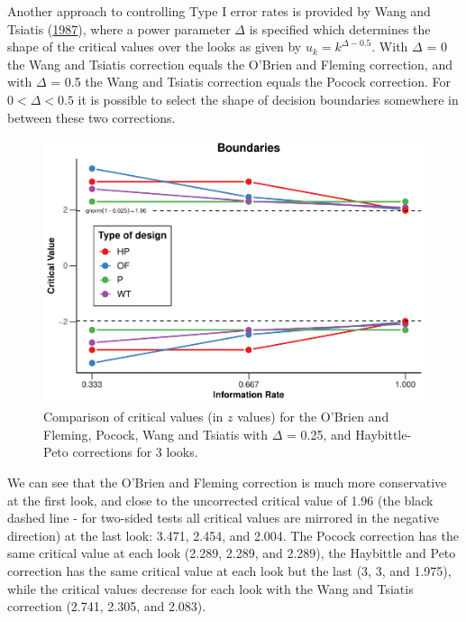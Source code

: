 \documentclass[
  english,
  ,man,floatsintext]{apa6}
\begin{document}
Another approach to controlling Type I error rates is provided by Wang and Tsiatis (\protect\hyperlink{ref-wang_approximately_1987}{1987}), where a power parameter \(\Delta\) is specified which determines the shape of the critical values over the looks as given by \(u_k = k^{\Delta - 0.5}\). With \(\Delta\) = 0 the Wang and Tsiatis correction equals the O'Brien and Fleming correction, and with \(\Delta\) = 0.5 the Wang and Tsiatis correction equals the Pocock correction. For \(0 < \Delta < 0.5\) it is possible to select the shape of decision boundaries somewhere in between these two corrections.

\begin{figure}
\centering
\includegraphics{sequential_tutorial_files/figure-latex/spending-comparison-1.pdf}
\caption{\label{fig:spending-comparison}Comparison of critical values (in \(z\) values) for the O'Brien and Fleming, Pocock, Wang and Tsiatis with \(\Delta\) = 0.25, and Haybittle-Peto corrections for 3 looks.}
\end{figure}

We can see that the O'Brien and Fleming correction is much more conservative at the first look, and close to the uncorrected critical value of 1.96 (the black dashed line - for two-sided tests all critical values are mirrored in the negative direction) at the last look: 3.471, 2.454, and 2.004. The Pocock correction has the same critical value at each look (2.289, 2.289, and 2.289), the Haybittle and Peto correction has the same critical value at each look but the last (3, 3, and 1.975), while the critical values decrease for each look with the Wang and Tsiatis correction (2.741, 2.305, and 2.083).
\end{document}
